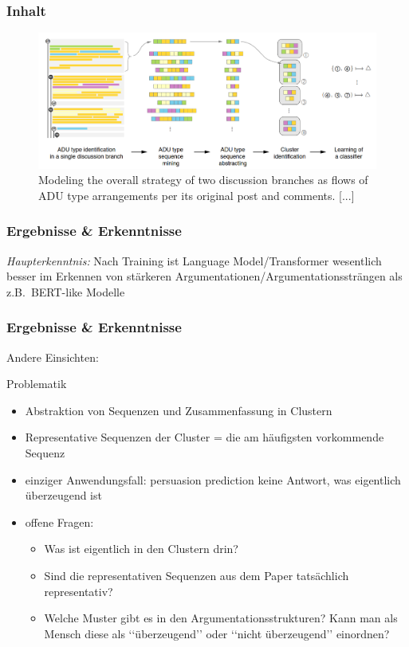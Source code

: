 \documentclass[compress,12pt]{beamer}
\begin{document}
    \begin{frame}
        \frametitle{Inhalt}
        \begin{figure}
            \centering
            \includegraphics[width=\textwidth]{../images/sequencing}
            \caption{Modeling the overall strategy of two discussion branches as flows of ADU type arrangements per its original post and comments. [...]}
            \label{fig:adu-sequencing}
        \end{figure}
    \end{frame}

    \begin{frame}
        \frametitle{Ergebnisse \& Erkenntnisse}
        \textit{Haupterkenntnis:} Nach Training ist Language Model/Transformer wesentlich besser im Erkennen von stärkeren Argumentationen/Argumentationssträngen als z.B.\ BERT-like Modelle
    \end{frame}

    \begin{frame}
        \frametitle{Ergebnisse \& Erkenntnisse}
        Andere Einsichten:
    \end{frame}

    \begin{frame}{Problematik}
        \begin{itemize}
            \item Abstraktion von Sequenzen und Zusammenfassung in Clustern
            \item Representative Sequenzen der Cluster = die am häufigsten vorkommende Sequenz
            \item einziger Anwendungsfall: persuasion prediction \textrightarrow{} keine Antwort, was eigentlich überzeugend ist
            \item offene Fragen:
            \begin{itemize}
                \item Was ist eigentlich in den Clustern drin?
                \item Sind die representativen Sequenzen aus dem Paper tatsächlich representativ?
                \item Welche Muster gibt es in den Argumentationsstrukturen?
                Kann man als Mensch diese als \lq\lq{}überzeugend\rq\rq{} oder \lq\lq{}nicht überzeugend\rq\rq{} einordnen?
            \end{itemize}
        \end{itemize}
    \end{frame}
\end{document}
